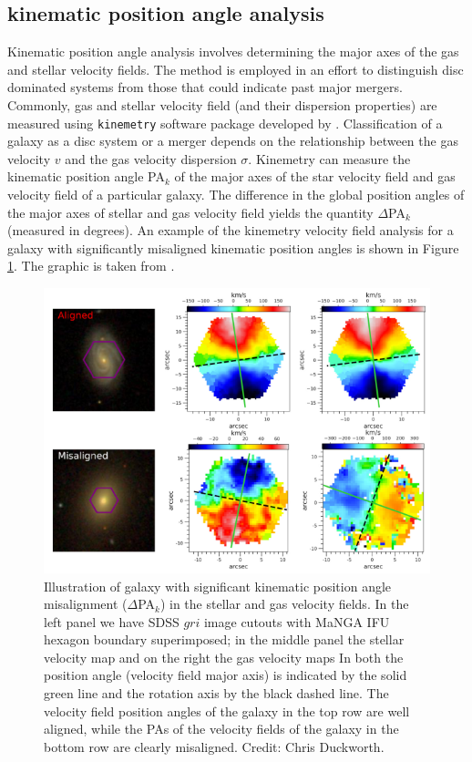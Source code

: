 \subsection{kinematic position angle analysis}
Kinematic position angle analysis involves determining the major axes of the gas and stellar velocity fields. The method is employed in an effort to distinguish disc dominated systems from those that could indicate past major mergers. Commonly, gas and stellar velocity field (and their dispersion properties) are measured using \texttt{kinemetry} software package developed by \citet{2006MNRAS.366..787K}. Classification of a galaxy as a disc system or a merger depends on the relationship between the gas velocity $v$ and the gas velocity dispersion $\sigma$. Kinemetry can measure the kinematic position angle PA$_k$ of the major axes of the star velocity field and gas velocity field of a particular galaxy. The difference in the global position angles of the major axes of stellar and gas velocity field yields the quantity $\Delta$PA$_{k}$ (measured in degrees). An example of the kinemetry velocity field analysis for a galaxy with significantly misaligned kinematic position angles is shown in Figure \ref{fig:alligned-misaligned}. The graphic is taken from \citet{2019MNRAS.483..172D}.

\begin{figure}
    \centering
    \includegraphics[width=\columnwidth]{images/PAplots/Aligned-Misalligned-DeltaPAs.png}
    \caption{Illustration of galaxy with significant kinematic position angle misalignment ($\Delta$PA$_{k}$) in the stellar and gas velocity fields. In the left panel we have SDSS $gri$ image cutouts with MaNGA IFU hexagon boundary superimposed; in the middle panel the stellar velocity map and on the right the gas velocity maps  In both the position angle (velocity field major axis) is indicated by the solid green line and the rotation axis by the black dashed line. The velocity field position angles of the galaxy in the top row are well aligned, while the PAs of the velocity fields of the galaxy in the bottom row are clearly misaligned. Credit: Chris Duckworth.}
    \label{fig:alligned-misaligned}
\end{figure}

